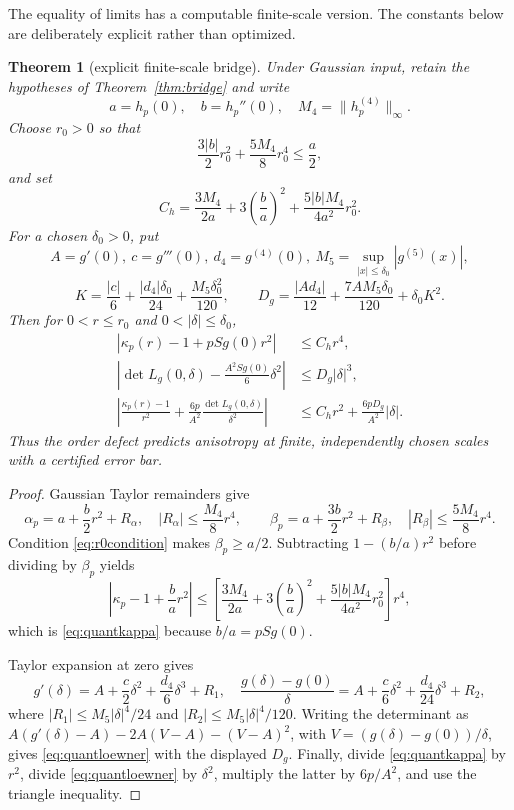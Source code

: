 \documentclass[11pt]{article}
\newtheorem{theorem}{Theorem}[section]
\begin{document}
The equality of limits has a computable finite-scale version.  The constants below are deliberately explicit rather
than optimized.

\begin{theorem}[explicit finite-scale bridge]
\label{thm:finitebridge}
Under Gaussian input, retain the hypotheses of Theorem~\ref{thm:bridge} and write
\[
 a=h_p(0),\quad b=h_p''(0),\quad M_4=\lVert h_p^{(4)}\rVert_\infty.
\]
Choose $r_0>0$ so that
\begin{equation}
 \frac{3|b|}{2}r_0^2+\frac{5M_4}{8}r_0^4\le\frac a2,
 \label{eq:r0condition}
\end{equation}
and set
\[
 C_h=\frac{3M_4}{2a}+3\left(\frac ba\right)^2
       +\frac{5|b|M_4}{4a^2}r_0^2.
\]
For a chosen $\delta_0>0$, put
\[
 A=g'(0),\ c=g'''(0),\ d_4=g^{(4)}(0),\
 M_5=\sup_{|x|\le\delta_0}|g^{(5)}(x)|,
\]
\[
 K=\frac{|c|}{6}+\frac{|d_4|\delta_0}{24}
      +\frac{M_5\delta_0^2}{120},\qquad
 D_g=\frac{|Ad_4|}{12}+\frac{7AM_5\delta_0}{120}+\delta_0K^2.
\]
Then for $0<r\le r_0$ and $0<|\delta|\le\delta_0$,
\begin{align}
 \left|\kappa_p(r)-1+pSg(0)r^2\right|&\le C_hr^4,
 \label{eq:quantkappa}\\
 \left|\det L_g(0,\delta)-\frac{A^2Sg(0)}6\delta^2\right|
 &\le D_g|\delta|^3,
 \label{eq:quantloewner}\\
 \left|\frac{\kappa_p(r)-1}{r^2}
 +\frac{6p}{A^2}\frac{\det L_g(0,\delta)}{\delta^2}\right|
 &\le C_hr^2+\frac{6pD_g}{A^2}|\delta|.
 \label{eq:directfinitebridge}
\end{align}
Thus the order defect predicts anisotropy at finite, independently chosen scales with a certified error bar.
\end{theorem}

\begin{proof}
Gaussian Taylor remainders give
\[
 \alpha_p=a+\frac b2r^2+R_\alpha,\quad |R_\alpha|\le\frac{M_4}{8}r^4,
 \qquad
 \beta_p=a+\frac{3b}{2}r^2+R_\beta,\quad |R_\beta|\le\frac{5M_4}{8}r^4.
\]
Condition \eqref{eq:r0condition} makes $\beta_p\ge a/2$.  Subtracting
$1-(b/a)r^2$ before dividing by $\beta_p$ yields
\[
 \left|\kappa_p-1+\frac ba r^2\right|
 \le\left[
 \frac{3M_4}{2a}+3\left(\frac ba\right)^2
 +\frac{5|b|M_4}{4a^2}r_0^2\right]r^4,
\]
which is \eqref{eq:quantkappa} because $b/a=pSg(0)$.

Taylor expansion at zero gives
\[
 g'(\delta)=A+\frac c2\delta^2+\frac{d_4}{6}\delta^3+R_1,\quad
 \frac{g(\delta)-g(0)}\delta
 =A+\frac c6\delta^2+\frac{d_4}{24}\delta^3+R_2,
\]
where $|R_1|\le M_5|\delta|^4/24$ and
$|R_2|\le M_5|\delta|^4/120$.  Writing the determinant as
$A(g'(\delta)-A)-2A(V-A)-(V-A)^2$, with
$V=(g(\delta)-g(0))/\delta$, gives \eqref{eq:quantloewner} with the displayed $D_g$.
Finally, divide \eqref{eq:quantkappa} by $r^2$, divide
\eqref{eq:quantloewner} by $\delta^2$, multiply the latter by $6p/A^2$, and use the triangle inequality.
\end{proof}
\end{document}
